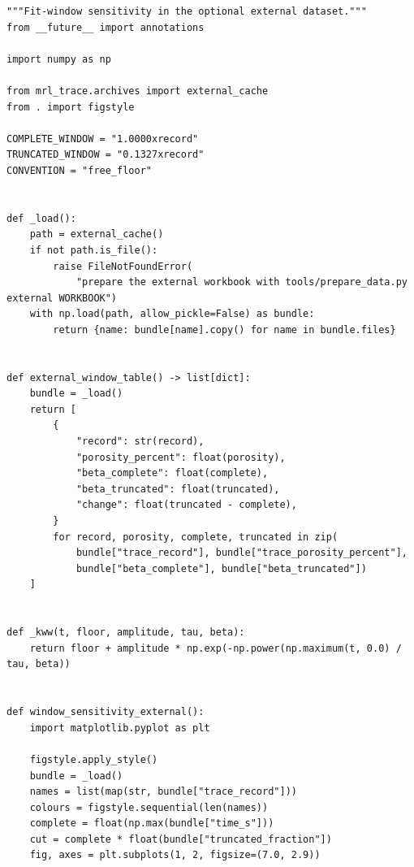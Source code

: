 \documentclass[a4paper,10pt]{article}
\begin{document}
\begin{Verbatim}
"""Fit-window sensitivity in the optional external dataset."""
from __future__ import annotations

import numpy as np

from mrl_trace.archives import external_cache
from . import figstyle

COMPLETE_WINDOW = "1.0000xrecord"
TRUNCATED_WINDOW = "0.1327xrecord"
CONVENTION = "free_floor"


def _load():
    path = external_cache()
    if not path.is_file():
        raise FileNotFoundError(
            "prepare the external workbook with tools/prepare_data.py external WORKBOOK")
    with np.load(path, allow_pickle=False) as bundle:
        return {name: bundle[name].copy() for name in bundle.files}


def external_window_table() -> list[dict]:
    bundle = _load()
    return [
        {
            "record": str(record),
            "porosity_percent": float(porosity),
            "beta_complete": float(complete),
            "beta_truncated": float(truncated),
            "change": float(truncated - complete),
        }
        for record, porosity, complete, truncated in zip(
            bundle["trace_record"], bundle["trace_porosity_percent"],
            bundle["beta_complete"], bundle["beta_truncated"])
    ]


def _kww(t, floor, amplitude, tau, beta):
    return floor + amplitude * np.exp(-np.power(np.maximum(t, 0.0) / tau, beta))


def window_sensitivity_external():
    import matplotlib.pyplot as plt

    figstyle.apply_style()
    bundle = _load()
    names = list(map(str, bundle["trace_record"]))
    colours = figstyle.sequential(len(names))
    complete = float(np.max(bundle["time_s"]))
    cut = complete * float(bundle["truncated_fraction"])
    fig, axes = plt.subplots(1, 2, figsize=(7.0, 2.9))


\end{Verbatim}
\end{document}
